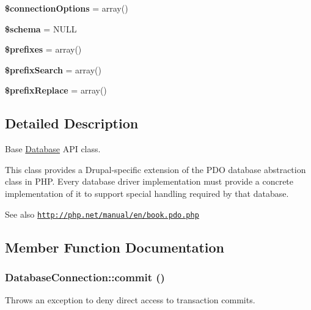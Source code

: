 \begin{DoxyCompactItemize}
\item 
\hypertarget{classDatabaseConnection_adbd61bca7e83c54ec580801d1bca8b08}{
{\bfseries \$connectionOptions} = array()}
\label{classDatabaseConnection_adbd61bca7e83c54ec580801d1bca8b08}

\item 
\hypertarget{classDatabaseConnection_ac51730013a465c8bd81db699b0a1bd59}{
{\bfseries \$schema} = NULL}
\label{classDatabaseConnection_ac51730013a465c8bd81db699b0a1bd59}

\item 
\hypertarget{classDatabaseConnection_a1a56735cc64b105ad7c8ee0c6ef4a7e1}{
{\bfseries \$prefixes} = array()}
\label{classDatabaseConnection_a1a56735cc64b105ad7c8ee0c6ef4a7e1}

\item 
\hypertarget{classDatabaseConnection_aa18b2ac131d2556fa20705016158f2e2}{
{\bfseries \$prefixSearch} = array()}
\label{classDatabaseConnection_aa18b2ac131d2556fa20705016158f2e2}

\item 
\hypertarget{classDatabaseConnection_a456ff1dc845f1803e0d6840f3ad50b7e}{
{\bfseries \$prefixReplace} = array()}
\label{classDatabaseConnection_a456ff1dc845f1803e0d6840f3ad50b7e}

\end{DoxyCompactItemize}


\subsection{Detailed Description}
Base \hyperlink{classDatabase}{Database} API class.

This class provides a Drupal-\/specific extension of the PDO database abstraction class in PHP. Every database driver implementation must provide a concrete implementation of it to support special handling required by that database.

\begin{DoxySeeAlso}{See also}
\href{http://php.net/manual/en/book.pdo.php}{\tt http://php.net/manual/en/book.pdo.php} 
\end{DoxySeeAlso}


\subsection{Member Function Documentation}
\hypertarget{classDatabaseConnection_a7e938dd2dbf5bbef8e2eb06bda3eeb2f}{
\subsubsection[{commit}]{\setlength{\rightskip}{0pt plus 5cm}DatabaseConnection::commit ()}}
\label{classDatabaseConnection_a7e938dd2dbf5bbef8e2eb06bda3eeb2f}
Throws an exception to deny direct access to transaction commits.

